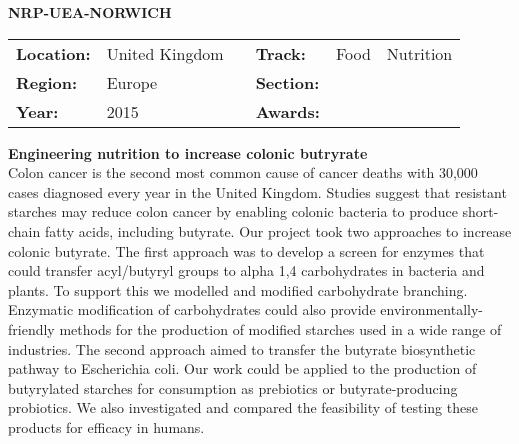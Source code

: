 \textbf{\uppercase{NRP-UEA-Norwich}}
\FloatBarrier
\begin{table}[h]
\begin{tabular}{lp{2.5cm}llll}
\textbf{Location:} & United Kingdom & \multicolumn{1}{|l}{} & \textbf{Track:}   & Food & Nutrition \\
\textbf{Region:}   & Europe   & \multicolumn{1}{|l}{} & \textbf{Section:} &  \\
\textbf{Year:}     & 2015   & \multicolumn{1}{|l}{} & \textbf{Awards:}  &
\end{tabular}
\end{table}
\FloatBarrier
\noindent	\textbf{Engineering nutrition to increase colonic butryrate} \vspace{.2cm}\\
Colon cancer is the second most common cause of cancer deaths with 30,000 cases diagnosed every year in the United Kingdom. Studies suggest that resistant starches may reduce colon cancer by enabling colonic bacteria to produce short-chain fatty acids, including butyrate.
Our project took two approaches to increase colonic butyrate. The first approach was to develop a screen for enzymes that could transfer acyl/butyryl groups to alpha 1,4 carbohydrates in bacteria and plants. To support this we modelled and modified carbohydrate branching. Enzymatic modification of carbohydrates could also provide environmentally-friendly methods for the production of modified starches used in a wide range of industries. The second approach aimed to transfer the butyrate biosynthetic pathway to Escherichia coli.
Our work could be applied to the production of butyrylated starches for consumption as prebiotics or butyrate-producing probiotics. We also investigated and compared the feasibility of testing these products for efficacy in humans.
\vspace{2cm}

